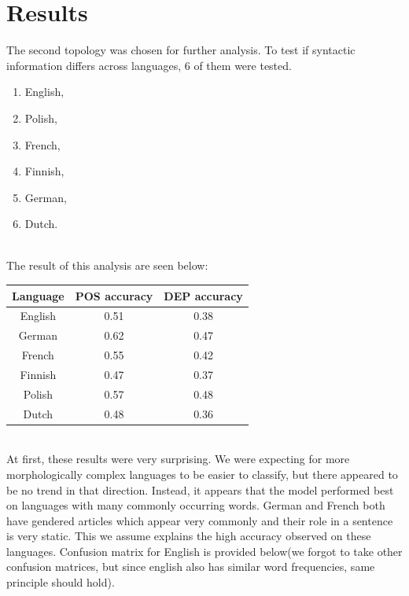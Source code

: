\clearpage

\section{Results}
The second topology was chosen for further analysis. To test if syntactic information differs across languages, 6 of them were tested.
  \begin{enumerate}
      \item English,
      \item Polish,
      \item French,
      \item Finnish,
      \item German,
      \item Dutch.
  \end{enumerate}\\
The result of this analysis are seen below:
    \begin{table}[h!]
\begin{tabular}{|c|c|c|}
\hline
Language & POS accuracy & DEP accuracy \\ \hline
English  & 0.51         & 0.38         \\ \hline
German   & 0.62         & 0.47         \\ \hline
French   & 0.55         & 0.42         \\ \hline
Finnish  & 0.47         & 0.37         \\ \hline
Polish   & 0.57         & 0.48         \\ \hline
Dutch    & 0.48         & 0.36         \\ \hline
\end{tabular}
\end{table}\\
At first, these results were very surprising. We were expecting for more morphologically complex languages to be easier to classify, but there appeared
to be no trend in that direction. Instead, it appears that the model performed best on languages with many commonly occurring words. German and French both
have gendered articles which appear very commonly and their role in a sentence is very static. This we assume explains the high accuracy observed on these
languages. Confusion matrix for English is provided below(we forgot to take other confusion matrices, but since english also has similar word frequencies, same principle should hold).
